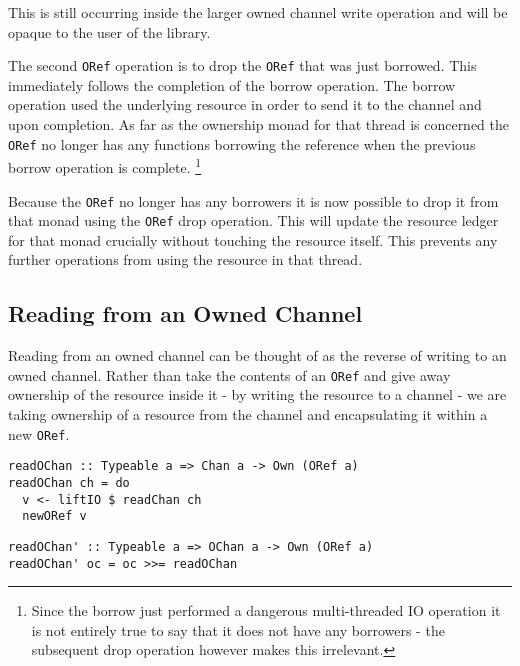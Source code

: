 \documentclass[onehalf,11pt]{beavtex}
\begin{document}

This is still occurring inside the larger owned channel write operation and will
be opaque to the user of the library.

The second \texttt{ORef} operation is to drop the \texttt{ORef} that was just
borrowed. This immediately follows the completion of the borrow operation. The
borrow operation used the underlying resource in order to send it to the channel
and upon completion. As far as the ownership monad for that thread is
concerned the \texttt{ORef} no longer has any functions borrowing the reference
when the previous borrow operation is complete.
\footnote{Since the borrow just performed a dangerous multi-threaded IO operation
  it is not entirely true to say that it does not have any borrowers - the
  subsequent drop operation however makes this irrelevant.}

Because the \texttt{ORef} no longer has any borrowers it is now possible to
drop it from that monad using the \texttt{ORef} drop operation.  This will
update the resource ledger for that monad crucially without touching the
resource itself.
This prevents any further operations from using the resource
in that thread.

\subsection{Reading from an Owned Channel}

Reading from an owned channel can be thought of as the reverse of
writing to an owned channel.  Rather than take the contents of an
\texttt{ORef} and give away ownership of the resource inside it - by writing the
resource to a channel - we are taking ownership of a resource from the channel
and encapsulating it within a new \texttt{ORef}.

\begin{verbatim}
readOChan :: Typeable a => Chan a -> Own (ORef a)
readOChan ch = do
  v <- liftIO $ readChan ch
  newORef v
\end{verbatim}

\begin{verbatim}
readOChan' :: Typeable a => OChan a -> Own (ORef a)
readOChan' oc = oc >>= readOChan
\end{verbatim}
\end{document}
